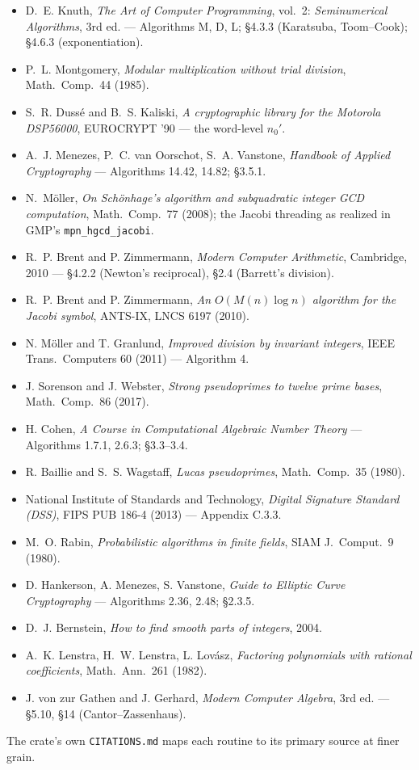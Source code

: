 \documentclass[11pt]{article}
\newcommand{\code}[1]{\texttt{#1}}
\begin{document}
\begin{itemize}
\item D.~E. Knuth, \emph{The Art of Computer Programming}, vol.~2:
  \emph{Seminumerical Algorithms}, 3rd ed. --- Algorithms M, D, L;
  \S4.3.3 (Karatsuba, Toom--Cook); \S4.6.3 (exponentiation).
\item P.~L. Montgomery, \emph{Modular multiplication without trial
  division}, Math.\ Comp.\ 44 (1985).
\item S.~R. Duss\'e and B.~S. Kaliski, \emph{A cryptographic library for
  the Motorola DSP56000}, EUROCRYPT '90 --- the word-level $n_0'$.
\item A.~J. Menezes, P.~C. van Oorschot, S.~A. Vanstone, \emph{Handbook of
  Applied Cryptography} --- Algorithms 14.42, 14.82; \S3.5.1.
\item N.~M\"oller, \emph{On Sch\"onhage's algorithm and subquadratic
  integer GCD computation}, Math.\ Comp.\ 77 (2008); the Jacobi threading
  as realized in GMP's \code{mpn\_hgcd\_jacobi}.
\item R.~P. Brent and P. Zimmermann, \emph{Modern Computer Arithmetic},
  Cambridge, 2010 --- \S4.2.2 (Newton's reciprocal), \S2.4 (Barrett's
  division).
\item R.~P. Brent and P. Zimmermann, \emph{An $O(M(n) \log n)$ algorithm
  for the Jacobi symbol}, ANTS-IX, LNCS 6197 (2010).
\item N. M\"oller and T. Granlund, \emph{Improved division by invariant
  integers}, IEEE Trans.\ Computers 60 (2011) --- Algorithm 4.
\item J. Sorenson and J. Webster, \emph{Strong pseudoprimes to twelve prime
  bases}, Math.\ Comp.\ 86 (2017).
\item H. Cohen, \emph{A Course in Computational Algebraic Number Theory}
  --- Algorithms 1.7.1, 2.6.3; \S3.3--3.4.
\item R. Baillie and S.~S. Wagstaff, \emph{Lucas pseudoprimes},
  Math.\ Comp.\ 35 (1980).
\item National Institute of Standards and Technology, \emph{Digital
  Signature Standard (DSS)}, FIPS PUB 186-4 (2013) --- Appendix C.3.3.
\item M.~O. Rabin, \emph{Probabilistic algorithms in finite fields},
  SIAM J.\ Comput.\ 9 (1980).
\item D. Hankerson, A. Menezes, S. Vanstone, \emph{Guide to Elliptic Curve
  Cryptography} --- Algorithms 2.36, 2.48; \S2.3.5.
\item D.~J. Bernstein, \emph{How to find smooth parts of integers}, 2004.
\item A.~K. Lenstra, H.~W. Lenstra, L. Lov\'asz, \emph{Factoring
  polynomials with rational coefficients}, Math.\ Ann.\ 261 (1982).
\item J. von zur Gathen and J. Gerhard, \emph{Modern Computer Algebra},
  3rd ed. --- \S5.10, \S14 (Cantor--Zassenhaus).
\end{itemize}

The crate's own \code{CITATIONS.md} maps each routine to its primary
source at finer grain.
\end{document}
